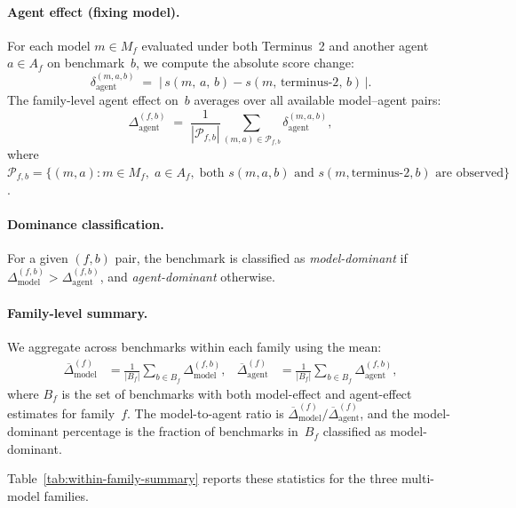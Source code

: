 \paragraph{Agent effect (fixing model).}
For each model $m \in M_f$ evaluated under both Terminus~2 and another agent
$a \in A_f$ on benchmark~$b$, we compute the absolute score change:
\begin{equation}
  \delta_{\mathrm{agent}}^{(m,a,b)}
  \;=\;
  \bigl|\, s(m,\,a,\,b) - s(m,\,\text{terminus-2},\,b) \,\bigr|.
  \label{eq:agent-delta}
\end{equation}
The family-level agent effect on~$b$ averages over all available model--agent pairs:
\begin{equation}
  \Delta_{\mathrm{agent}}^{(f,b)}
  \;=\;
  \frac{1}{|\mathcal{P}_{f,b}|}
  \sum_{(m,a)\in \mathcal{P}_{f,b}}
  \delta_{\mathrm{agent}}^{(m,a,b)},
  \label{eq:agent-effect}
\end{equation}
where $\mathcal{P}_{f,b} = \{(m,a) : m \in M_f,\; a \in A_f,\; \text{both }
s(m,a,b) \text{ and } s(m,\text{terminus-2},b) \text{ are observed}\}$.

\paragraph{Dominance classification.}
For a given $(f, b)$ pair, the benchmark is classified as
\emph{model-dominant} if $\Delta_{\mathrm{model}}^{(f,b)} >
\Delta_{\mathrm{agent}}^{(f,b)}$, and \emph{agent-dominant} otherwise.

\paragraph{Family-level summary.}
We aggregate across benchmarks within each family using the mean:
\begin{align}
  \overline{\Delta}_{\mathrm{model}}^{(f)}
  &= \frac{1}{|B_f|}\sum_{b \in B_f} \Delta_{\mathrm{model}}^{(f,b)}, &
  \overline{\Delta}_{\mathrm{agent}}^{(f)}
  &= \frac{1}{|B_f|}\sum_{b \in B_f} \Delta_{\mathrm{agent}}^{(f,b)},
  \label{eq:family-summary}
\end{align}
where $B_f$ is the set of benchmarks with both model-effect and agent-effect
estimates for family~$f$.  The model-to-agent ratio is
$\overline{\Delta}_{\mathrm{model}}^{(f)} / \overline{\Delta}_{\mathrm{agent}}^{(f)}$,
and the model-dominant percentage is the fraction of benchmarks in~$B_f$
classified as model-dominant.

Table~\ref{tab:within-family-summary} reports these statistics for the three
multi-model families.

